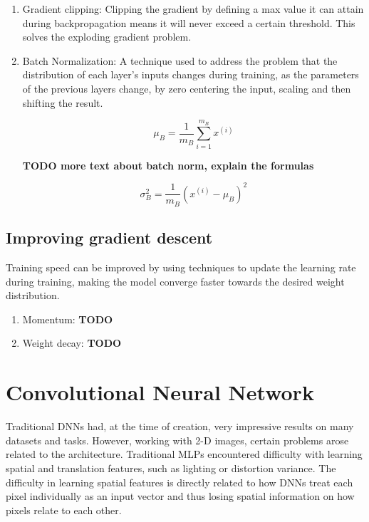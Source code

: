 \documentclass[english, bibtex]{kththesis}
\begin{document}
\begin{enumerate}
\item Gradient clipping\cite{quintana1974clipping}: Clipping the gradient by defining a max value it can attain during backpropagation means it will never exceed a certain threshold. This solves the exploding gradient problem.

\item Batch Normalization\cite{ioffe2015batch}: A technique used to address the problem that the distribution of each layer’s inputs changes during training, as the parameters of the previous layers change, by zero centering the input, scaling and then shifting the result. 

\begin{equation}
	\mu_B = \frac{1}{m_B} \sum_{i=1}^{m_B} x^{(i)}
  	\label{eqn:batchnorm}
\end{equation}

\textbf{TODO more text about batch norm, explain the formulas}

\begin{equation}
	\sigma_B^2 = \frac{1}{m_B} (x^{(i)} - \mu_B)^2
  	\label{eqn:batchnormtwo}
\end{equation}

\end{enumerate}
\subsection{Improving gradient descent}

Training speed can be improved by using techniques to update the learning rate during training, making the model converge faster towards the desired weight distribution.
\begin{enumerate}
\item Momentum: \textbf{TODO}
\item Weight decay: \textbf{TODO}
\end{enumerate}


\section{Convolutional Neural Network}

Traditional DNNs had, at the time of creation, very impressive results on many datasets and tasks. However, working with 2-D images, certain problems arose related to the architecture. Traditional MLPs encountered difficulty with learning spatial and translation features, such as lighting or distortion variance. The difficulty in learning spatial features is directly related to how DNNs treat each pixel individually as an input vector and thus losing spatial information on how pixels relate to each other.
\end{document}
